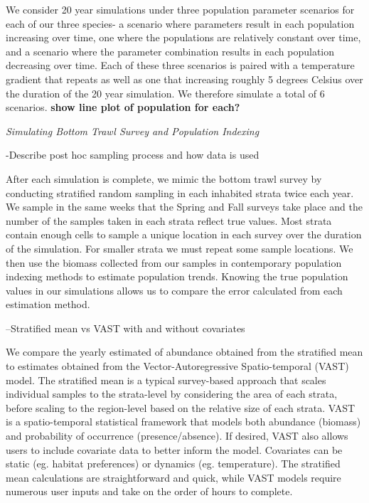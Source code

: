 \documentclass[
]{article}
\begin{document}
We consider 20 year simulations under three population parameter scenarios for each of our three species- a scenario where parameters result in each population increasing over time, one where the populations are relatively constant over time, and a scenario where the parameter combination results in each population decreasing over time. Each of these three scenarios is paired with a temperature gradient that repeats as well as one that increasing roughly 5 degrees Celsius over the duration of the 20 year simulation. We therefore simulate a total of 6 scenarios. \textbf{show line plot of population for each?}

\emph{Simulating Bottom Trawl Survey and Population Indexing}

-Describe post hoc sampling process and how data is used

After each simulation is complete, we mimic the bottom trawl survey by conducting stratified random sampling in each inhabited strata twice each year. We sample in the same weeks that the Spring and Fall surveys take place and the number of the samples taken in each strata reflect true values. Most strata contain enough cells to sample a unique location in each survey over the duration of the simulation. For smaller strata we must repeat some sample locations. We then use the biomass collected from our samples in contemporary population indexing methods to estimate population trends. Knowing the true population values in our simulations allows us to compare the error calculated from each estimation method.

--Stratified mean vs VAST with and without covariates

We compare the yearly estimated of abundance obtained from the stratified mean to estimates obtained from the Vector-Autoregressive Spatio-temporal (VAST) model. The stratified mean is a typical survey-based approach that scales individual samples to the strata-level by considering the area of each strata, before scaling to the region-level based on the relative size of each strata. VAST is a spatio-temporal statistical framework that models both abundance (biomass) and probability of occurrence (presence/absence). If desired, VAST also allows users to include covariate data to better inform the model. Covariates can be static (eg. habitat preferences) or dynamics (eg. temperature). The stratified mean calculations are straightforward and quick, while VAST models require numerous user inputs and take on the order of hours to complete.
\end{document}
